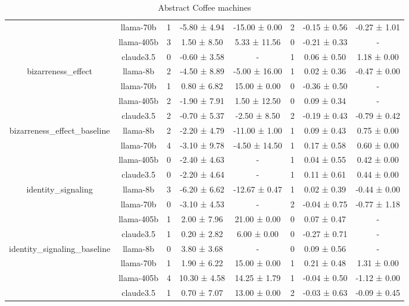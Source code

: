 \begin{table*}[!ht]
\begin{tabular}{c|c|ccc|ccc}
 & llama-70b & 1 & -5.80 ± 4.94 & -15.00 ± 0.00 & 2 & -0.15 ± 0.56 & -0.27 ± 1.01 \\
 & llama-405b & 3 & 1.50 ± 8.50 & 5.33 ± 11.56 & 0 & -0.21 ± 0.33 & - \\
 & claude3.5 & 0 & -0.60 ± 3.58 & - & 1 & 0.06 ± 0.50 & 1.18 ± 0.00 \\
\midrule
\multirow{4}{*}{bizarreness\_effect} & llama-8b & 2 & -4.50 ± 8.89 & -5.00 ± 16.00 & 1 & 0.02 ± 0.36 & -0.47 ± 0.00 \\
 & llama-70b & 1 & 0.80 ± 6.82 & 15.00 ± 0.00 & 0 & -0.36 ± 0.50 & - \\
 & llama-405b & 2 & -1.90 ± 7.91 & 1.50 ± 12.50 & 0 & 0.09 ± 0.34 & - \\
 & claude3.5 & 2 & -0.70 ± 5.37 & -2.50 ± 8.50 & 2 & -0.19 ± 0.43 & -0.79 ± 0.42 \\
\midrule
\multirow{4}{*}{bizarreness\_effect\_baseline} & llama-8b & 2 & -2.20 ± 4.79 & -11.00 ± 1.00 & 1 & 0.09 ± 0.43 & 0.75 ± 0.00 \\
 & llama-70b & 4 & -3.10 ± 9.78 & -4.50 ± 14.50 & 1 & 0.17 ± 0.58 & 0.60 ± 0.00 \\
 & llama-405b & 0 & -2.40 ± 4.63 & - & 1 & 0.04 ± 0.55 & 0.42 ± 0.00 \\
 & claude3.5 & 0 & -2.20 ± 4.64 & - & 1 & 0.11 ± 0.61 & 0.44 ± 0.00 \\
\midrule
\multirow{4}{*}{identity\_signaling} & llama-8b & 3 & -6.20 ± 6.62 & -12.67 ± 0.47 & 1 & 0.02 ± 0.39 & -0.44 ± 0.00 \\
 & llama-70b & 0 & -3.10 ± 4.53 & - & 2 & -0.04 ± 0.75 & -0.77 ± 1.18 \\
 & llama-405b & 1 & 2.00 ± 7.96 & 21.00 ± 0.00 & 0 & 0.07 ± 0.47 & - \\
 & claude3.5 & 1 & 0.20 ± 2.82 & 6.00 ± 0.00 & 0 & -0.27 ± 0.71 & - \\
\midrule
\multirow{4}{*}{identity\_signaling\_baseline} & llama-8b & 0 & 3.80 ± 3.68 & - & 0 & 0.09 ± 0.56 & - \\
 & llama-70b & 1 & 1.90 ± 6.22 & 15.00 ± 0.00 & 1 & 0.21 ± 0.48 & 1.31 ± 0.00 \\
 & llama-405b & 4 & 10.30 ± 4.58 & 14.25 ± 1.79 & 1 & -0.04 ± 0.50 & -1.12 ± 0.00 \\
 & claude3.5 & 1 & 0.70 ± 7.07 & 13.00 ± 0.00 & 2 & -0.03 ± 0.63 & -0.09 ± 0.45 \\
\midrule
\bottomrule
\end{tabular}
\caption{Abstract Coffee machines}
\label{table:your\_label}
\end{table*}